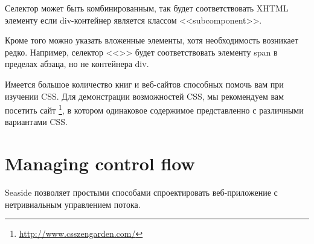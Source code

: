 \documentclass[a4paper,10pt,twoside]{book}
\begin{document}
Селектор может быть комбинированным, так 
будет соответствовать XHTML элементу если div-контейнер является
классом <<subcomponent>>. 


Кроме того можно указать вложенные элементы,
хотя необходимость возникает редко.
Например, селектор <<>> будет соответствовать элементу span
в пределах абзаца, но не контейнера div.


Имеется большое количество книг и веб-сайтов способных помочь вам
при изучении CSS.
Для демонстрации возможностей CSS,
мы рекомендуем вам посетить сайт \footnote{\url{http://www.csszengarden.com/}},
в котором одинаковое содержимое представленно с различными вариантами CSS.

\section{Managing control flow}


Seaside позволяет простыми способами спроектировать веб-приложение с
нетривиальным  управлением потока.

\end{document}
